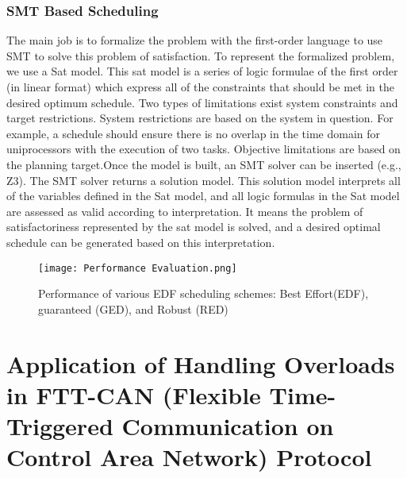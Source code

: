 \documentclass[conference]{IEEEtran}
\begin{document}
\subsubsection{SMT Based Scheduling}
The main job is to formalize the problem with the first-order language to use SMT to solve this problem of satisfaction. To represent the formalized problem, we use a Sat model. This sat model is a series of logic formulae of the first order (in linear format) which express all of the constraints that should be met in the desired optimum schedule. Two types of limitations exist system constraints and target restrictions. System restrictions are based on the system in question. For example, a schedule should ensure there is no overlap in the time domain for uniprocessors with the execution of two tasks. Objective limitations are based on the planning target.Once the model is built, an SMT solver can be inserted (e.g., Z3). The SMT solver returns a solution model. This solution model interprets all of the variables defined in the Sat model, and all logic formulas in the Sat model are assessed as valid according to interpretation. It means the problem of satisfactoriness represented by the sat model is solved, and a desired optimal schedule can be generated based on this interpretation.\cite{7515899}

\begin{figure}[htp]
    \centering
    \texttt{[image: Performance Evaluation.png]}
    \caption{Performance of various EDF scheduling schemes: Best Effort(EDF), guaranteed (GED), and Robust (RED){\cite{buttazzo2011hard}}}
    \label{fig:reg-gen}
\end{figure}


\section{Application of Handling Overloads in FTT-CAN (Flexible Time-Triggered Communication on Control Area Network) Protocol}
\end{document}
